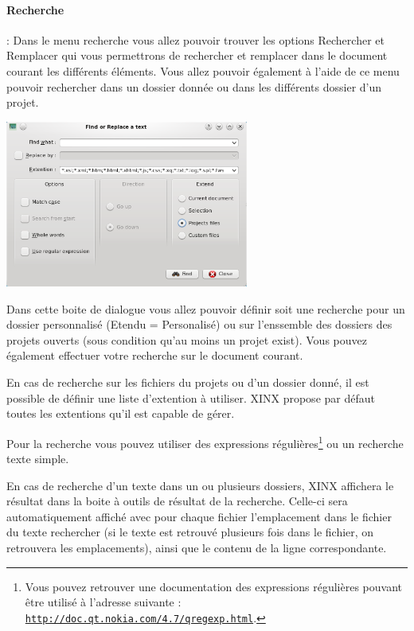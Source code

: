 \documentclass[a4paper,10pt,twoside]{book}
\begin{document}
\paragraph{Recherche} : Dans le menu recherche vous allez pouvoir trouver les options Rechercher et Remplacer qui vous permettrons de rechercher et remplacer dans le document courant les différents éléments. Vous allez pouvoir également à l'aide de ce menu pouvoir rechercher dans un dossier donnée ou dans les différents dossier d'un projet.

\begin{center}
 \includegraphics[width=0.60\textwidth]{./xinxsearch.png}
\end{center}

Dans cette boite de dialogue vous allez pouvoir définir soit une recherche pour un dossier personnalisé (Etendu = Personalisé) ou sur l'enssemble des dossiers des projets ouverts (sous condition qu'au moins un projet exist). Vous pouvez également effectuer votre recherche sur le document courant.

En cas de recherche sur les fichiers du projets ou d'un dossier donné, il est possible de définir une liste d'extention à utiliser. XINX propose par défaut toutes les extentions qu'il est capable de gérer. 

Pour la recherche vous pouvez utiliser des expressions régulières\footnote{Vous pouvez retrouver une documentation des expressions régulières pouvant être utilisé à l'adresse suivante : \hyperref{http://doc.qt.nokia.com/4.7/qregexp.html}{introduction}{}{\nolinkurl{http://doc.qt.nokia.com/4.7/qregexp.html}}.} ou un recherche texte simple.

En cas de recherche d'un texte dans un ou plusieurs dossiers, XINX affichera le résultat dans la boite à outils de résultat de la recherche. Celle-ci sera automatiquement affiché avec pour chaque fichier l'emplacement dans le fichier du texte rechercher (si le texte est retrouvé plusieurs fois dans le fichier, on retrouvera les emplacements), ainsi que le contenu de la ligne correspondante.
\end{document}
